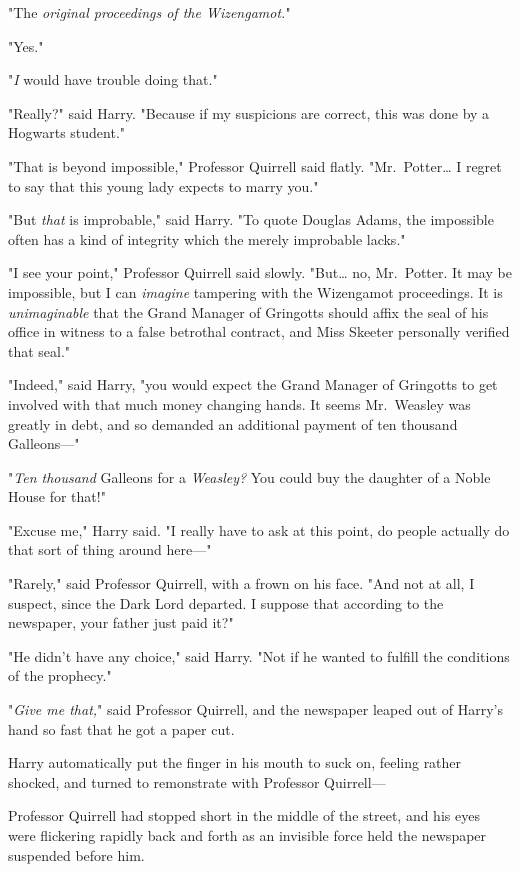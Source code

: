 "The \emph{original proceedings of the Wizengamot.}"

"Yes."

"\emph{I} would have trouble doing that."

"Really?" said Harry. "Because if my suspicions are correct, this was done by a 
Hogwarts student."

"That is beyond impossible," Professor Quirrell said flatly. 
"Mr.~Potter{\ldots} I regret to say that this young lady expects to marry you."

"But \emph{that} is improbable," said Harry. "To quote Douglas Adams, the 
impossible often has a kind of integrity which the merely improbable lacks."

"I see your point," Professor Quirrell said slowly. "But{\ldots} no, 
Mr.~Potter. It may be impossible, but I can \emph{imagine} tampering with the 
Wizengamot proceedings. It is \emph{unimaginable} that the Grand Manager of 
Gringotts should affix the seal of his office in witness to a false betrothal 
contract, and Miss Skeeter personally verified that seal."

"Indeed," said Harry, "you would expect the Grand Manager of Gringotts to get 
involved with that much money changing hands. It seems Mr.~Weasley was greatly 
in debt, and so demanded an additional payment of ten thousand Galleons---"

"\emph{Ten thousand} Galleons for a \emph{Weasley?} You could buy the daughter 
of a Noble House for that!"

"Excuse me," Harry said. "I really have to ask at this point, do people 
actually do that sort of thing around here---"

"Rarely," said Professor Quirrell, with a frown on his face. "And not at all, I 
suspect, since the Dark Lord departed. I suppose that according to the 
newspaper, your father just paid it?"

"He didn't have any choice," said Harry. "Not if he wanted to fulfill the 
conditions of the prophecy."

"\emph{Give me that,}" said Professor Quirrell, and the newspaper leaped out of 
Harry's hand so fast that he got a paper cut.

Harry automatically put the finger in his mouth to suck on, feeling rather 
shocked, and turned to remonstrate with Professor Quirrell---

Professor Quirrell had stopped short in the middle of the street, and his eyes 
were flickering rapidly back and forth as an invisible force held the newspaper 
suspended before him.

